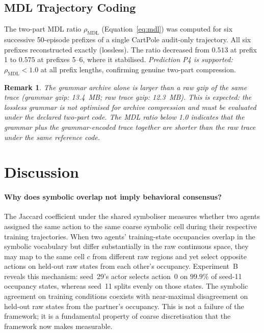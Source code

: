 \documentclass[12pt]{article}
\newtheorem{remark}{Remark}
\begin{document}
\subsection{MDL Trajectory Coding}
\label{sec:results:mdl}

The two-part MDL ratio $\rho_{\mathrm{MDL}}$ (Equation~\ref{eq:mdl})
was computed for six successive 50-episode prefixes of a single
CartPole audit-only trajectory.
All six prefixes reconstructed exactly (lossless).
The ratio decreased from $0.513$ at prefix 1 to $0.575$ at prefixes 5--6,
where it stabilised.
\emph{Prediction P4 is supported:} $\rho_{\mathrm{MDL}} < 1.0$ at all
prefix lengths, confirming genuine two-part compression.

\begin{remark}
The grammar archive alone is larger than a raw gzip of the same trace
(grammar gzip: 13.4~MB; raw trace gzip: 12.3~MB).
This is expected: the lossless grammar is not optimised for archive
compression and must be evaluated under the declared two-part code.
The MDL ratio below 1.0 indicates that the grammar plus the
grammar-encoded trace together are shorter than the raw trace under
the same reference code.
\end{remark}

\section{Discussion}
\label{sec:discussion}

\paragraph{Why does symbolic overlap not imply behavioral consensus?}
The Jaccard coefficient under the shared symboliser measures whether
two agents assigned the same action to the same coarse symbolic cell
during their respective training trajectories.
When two agents' training-state occupancies overlap in the symbolic vocabulary
but differ substantially in the raw continuous space, they may map
to the same cell $c$ from different raw regions and yet select
opposite actions on held-out raw states from each other's occupancy.
Experiment~B reveals this mechanism: seed~29's actor selects action~0
on $99.9\%$ of seed-11 occupancy states, whereas seed~11 splits evenly
on those states.
The symbolic agreement on training conditions coexists with near-maximal
disagreement on held-out raw states from the partner's occupancy.
This is not a failure of the framework; it is a fundamental property of
coarse discretisation that the framework now makes measurable.
\end{document}
